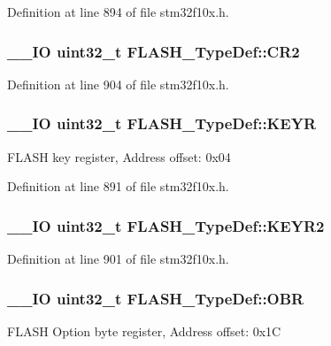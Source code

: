 Definition at line 894 of file stm32f10x.\-h.

\hypertarget{struct_f_l_a_s_h___type_def_a47c104621ec5af2bca07089c527ada3d}{
\subsubsection[{C\-R2}]{\setlength{\rightskip}{0pt plus 5cm}\-\_\-\-\_\-\-I\-O {\bf uint32\-\_\-t} F\-L\-A\-S\-H\-\_\-\-Type\-Def\-::\-C\-R2}}\label{struct_f_l_a_s_h___type_def_a47c104621ec5af2bca07089c527ada3d}


Definition at line 904 of file stm32f10x.\-h.

\hypertarget{struct_f_l_a_s_h___type_def_a802e9a26a89b44decd2d32d97f729dd3}{
\subsubsection[{K\-E\-Y\-R}]{\setlength{\rightskip}{0pt plus 5cm}\-\_\-\-\_\-\-I\-O {\bf uint32\-\_\-t} F\-L\-A\-S\-H\-\_\-\-Type\-Def\-::\-K\-E\-Y\-R}}\label{struct_f_l_a_s_h___type_def_a802e9a26a89b44decd2d32d97f729dd3}
F\-L\-A\-S\-H key register, Address offset\-: 0x04 

Definition at line 891 of file stm32f10x.\-h.

\hypertarget{struct_f_l_a_s_h___type_def_a4c26c83fce5b3ede2109127756559371}{
\subsubsection[{K\-E\-Y\-R2}]{\setlength{\rightskip}{0pt plus 5cm}\-\_\-\-\_\-\-I\-O {\bf uint32\-\_\-t} F\-L\-A\-S\-H\-\_\-\-Type\-Def\-::\-K\-E\-Y\-R2}}\label{struct_f_l_a_s_h___type_def_a4c26c83fce5b3ede2109127756559371}


Definition at line 901 of file stm32f10x.\-h.

\hypertarget{struct_f_l_a_s_h___type_def_a24dece1e3b3185456afe34c3dc6add2e}{
\subsubsection[{O\-B\-R}]{\setlength{\rightskip}{0pt plus 5cm}\-\_\-\-\_\-\-I\-O {\bf uint32\-\_\-t} F\-L\-A\-S\-H\-\_\-\-Type\-Def\-::\-O\-B\-R}}\label{struct_f_l_a_s_h___type_def_a24dece1e3b3185456afe34c3dc6add2e}
F\-L\-A\-S\-H Option byte register, Address offset\-: 0x1\-C 

